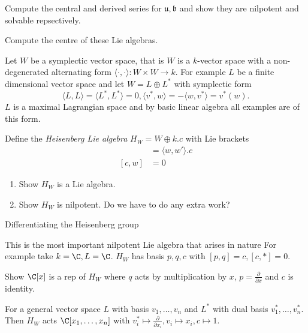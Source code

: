 \documentclass[a4paper]{article}
\newcommand*{\Lie}[1]{\mathfrak{#1}} %
\begin{document}
\begin{ex}
  Compute the central and derived series for \(\Lie u, \Lie b\) and show they are nilpotent and solvable repsectively.

  Compute the centre of these Lie algebras.
\end{ex}

\begin{eg}
  Let \(W\) be a symplectic vector space, that is \(W\) is a \(k\)-vector space with a non-degenerated alternating form \(\langle \cdot, \cdot \rangle: W \times W \to k\). For example \(L\) be a finite dimensional vector space and let \(W = L \oplus L^*\) with symplectic form
  \[
    \langle L, L \rangle = \langle L^*, L^* \rangle = 0, \langle v^*, w\rangle = - \langle w, v^* \rangle = v^*(w).
  \]
  \(L\) is a maximal Lagrangian space and by basic linear algebra all examples are of this form. 

  Define the \emph{Heisenberg Lie algebra} \(H_W = W \oplus k.c\) with Lie brackets
  \begin{align*}
    [w, w'] &= \langle w, w' \rangle . c \\
    [c, w] &= 0
  \end{align*}
\end{eg}

\begin{ex}\leavevmode
  \begin{enumerate}
  \item Show \(H_W\) is a Lie algebra.
  \item Show \(H_W\) is nilpotent. Do we have to do any extra work?
  \end{enumerate}
\end{ex}

Differentiating the Heisenberg group

This is the most important nilpotent Lie algebra that arises in nature For example take \(k = \C, L = \C\). \(H_W\) has basis \(p, q, c\) with \([p, q] = c, [c, *] = 0\).

\begin{ex}
  Show \(\C[x]\) is a rep of \(H_W\) where \(q\) acts by multiplication by \(x\), \(p = \frac{\partial  }{\partial x}\) and \(c\) is identity.
\end{ex}

For a general vector space \(L\) with basis \(v_1, \dots, v_n\) and \(L^*\) with dual basis \(v_1^*, \dots, v_n^*\). Then \(H_W\) acts \(\C[x_1, \dots, x_n]\) with \(v_i^* \mapsto \frac{\partial }{\partial x_i}, v_i \mapsto x_i, c \mapsto 1\).
\end{document}
